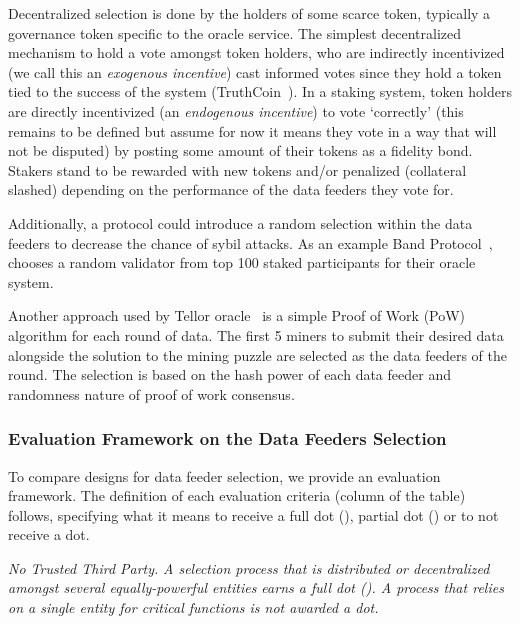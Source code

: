 Decentralized selection is done by the holders of some scarce token, typically a governance token specific to the oracle service. The simplest decentralized mechanism to hold a vote amongst token holders, who are indirectly incentivized (we call this an \textit{exogenous incentive}) cast informed votes since they hold a token tied to the success of the system (\eg TruthCoin~\cite{sztorc2015truthcoin}). In a staking system, token holders are directly incentivized (an \textit{endogenous incentive}) to vote `correctly' (this remains to be defined but assume for now it means they vote in a way that will not be disputed) by posting some amount of their tokens as a fidelity bond. Stakers stand to be rewarded with new tokens and/or penalized (collateral slashed) depending on the performance of the data feeders they vote for.


Additionally, a protocol could introduce a random selection within the data feeders to decrease the chance of sybil attacks. As an example Band Protocol~\cite{bandwhitepaper}, chooses a random validator from top 100 staked participants for their oracle system. 

Another approach used by Tellor oracle~\cite{tellorWhitepaper} is a simple Proof of Work (PoW) algorithm for each round of data. The first 5 miners to submit their desired data alongside the solution to the mining puzzle are selected as the data feeders of the round. The selection is based on the hash power of each data feeder and randomness nature of proof of work consensus.



\subsubsection{Evaluation Framework on the Data Feeders Selection}\label{evaluation_framework}
To compare designs for data feeder selection, we provide an evaluation framework. The definition of each evaluation criteria (\ie column of the table) follows, specifying what it means to receive a full dot (\full), partial dot (\prt) or to not receive a dot. 

\emph{No Trusted Third Party.} \textit{A selection process that is distributed or decentralized amongst several equally-powerful entities earns a full dot (\full). A process that relies on a single entity for critical functions is not awarded a dot.}

